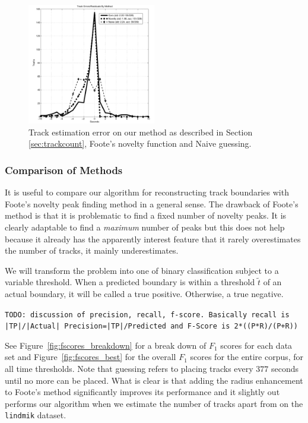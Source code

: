 \documentclass[twocolumn]{article}
\begin{document}
\begin{figure}
	\centering
	\includegraphics[width=0.5\textwidth]{images/trackshift}
	\caption{Track estimation error on our method as described in Section \ref{sec:trackcount}, Foote's novelty function and Naive guessing. }
	\label{fig:track_shift}
\end{figure}

\subsubsection{Comparison of Methods}

It is useful to compare our algorithm for reconstructing track boundaries with Foote's novelty peak finding method in a general sense. The drawback of Foote's method is that it is problematic to find a fixed number of novelty peaks. It is clearly adaptable to find a \textit{maximum} number of peaks but this does not help because it already has the apparently interest feature that it rarely overestimates the number of tracks, it mainly underestimates.

We will transform the problem into one of binary classification subject to a variable threshold. When a predicted boundary is within a threshold $\tilde t$ of an actual boundary, it will be called a true positive. Otherwise, a true negative. 

\texttt{TODO: discussion of precision, recall, f-score. Basically recall is |TP|/|Actual| Precision=|TP|/Predicted and F-Score is 2*((P*R)/(P+R))}

See Figure~\ref{fig:fscores_breakdown} for a break down of $F_1$ scores for each data set and Figure~\ref{fig:fscores_best} for the overall $F_1$ scores for the entire corpus, for all time thresholds. Note that guessing refers to placing tracks every $377$ seconds until no more can be placed. What is clear is that adding the radius enhancement to Foote's method significantly improves its performance and it slightly out performs our algorithm when we estimate the number of tracks apart from on the \texttt{lindmik} dataset. 
\end{document}
